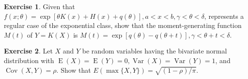 \documentclass{article}
\theoremstyle{definition}
\newtheorem*{exercise*}{Exercise}
\begin{document}
	\begin{exercise*}
	Given that $f(x ; \theta)=\exp [\theta K(x)+H(x)+q(\theta)], a<x<b, \gamma<\theta<\delta$, represents a regular case of the exponential class, show that the moment-generating function $M(t)$ of $Y=K(X)$ is $M(t)=\exp [q(\theta)-q(\theta+t)], \gamma<\theta+t<\delta$.
	\end{exercise*}
	\begin{exercise*}
	Let $X$ and $Y$ be random variables having the bivariate normal distribution with $\operatorname{E}(X)=\operatorname{E}(Y)=0, \operatorname{Var}(X)=\operatorname{Var}(Y)=1$,
	and $\operatorname{Cov}(X, Y)=\rho$. Show that $E(\max \{X, Y\})=\sqrt{(1-\rho) / \pi}$.
	\end{exercise*}
\end{document}
